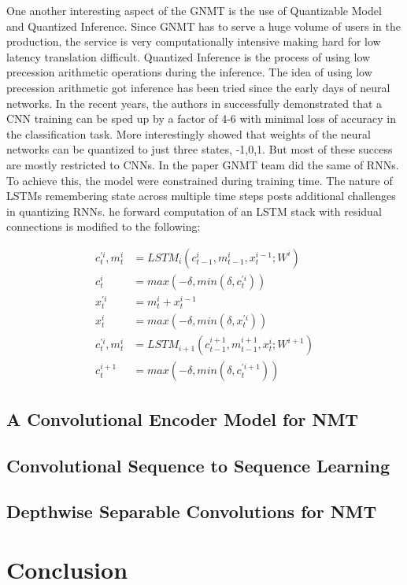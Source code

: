 \documentclass[a4paper]{article}
\begin{document}
One another interesting aspect of the GNMT is the use of Quantizable Model and Quantized Inference. Since GNMT has to serve a huge volume of users in the production, the service is very computationally intensive making hard for low latency translation difficult. Quantized Inference is the process of using low precession arithmetic operations during the inference. The idea of using low precession arithmetic got inference has been tried since the early days of neural networks. In the recent years, the authors in \cite{wu2016quantized} successfully demonstrated that a CNN training can be sped up by a factor of 4-6 with minimal loss of accuracy in the classification task. More interestingly \cite{li2016ternary} showed that weights of the neural networks can be quantized to just three states, -1,0,1. But most of these success are mostly restricted to CNNs. In the paper GNMT team did the same of RNNs. To achieve this, the model were constrained during training time. The nature of LSTMs remembering state across multiple time steps posts additional challenges in quantizing RNNs. he forward computation of an LSTM stack with residual connections is modified to the following: 


  
\begin{equation}
\begin{split}
c^{'i}_t,m^i_t    & = LSTM_i(c^{i}_{t-1},m^i_{t-1}, x^{i-1}_t; W^i ) \\
c^{i}_t		  & =  max(-\delta, min(\delta,c^{'i}_t )) \\
x^{'i}_t	  & = m^{i}_t + x^{i-1}_t \\
x^{i}_t		  & =  max(-\delta, min(\delta,x^{'i}_t )) \\
c^{'i}_t,m^i_t    & = LSTM_{i+1}(c^{i+1}_{t-1},m^{i+1}_{t-1}, x^{i}_t; W^{i+1} ) \\
c^{i+1}_t		  & =  max(-\delta, min(\delta,c^{'i+1}_t ))
\end{split}
\end{equation}




\subsection{A Convolutional Encoder Model for NMT}


\subsection{Convolutional Sequence to Sequence Learning}


\subsection{Depthwise Separable Convolutions for NMT}


\section{Conclusion}






\end{document}
